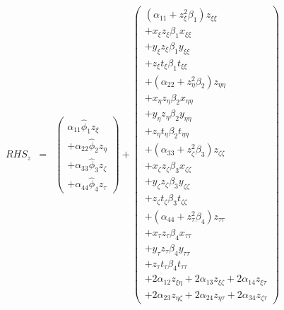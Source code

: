 \begin{eqnarray}
RHS_z
&=&
\left(
\begin{array}{r}
\alpha_{11} \widehat{\phi}_1 z_{\xi} 
\\
+
\alpha_{22} \widehat{\phi}_2 z_{\eta} 
\\
+
\alpha_{33} \widehat{\phi}_3 z_{\zeta} 
\\
+
\alpha_{44} \widehat{\phi}_4 z_{\tau} 
\end{array}
\right)
+
\left(
\begin{array}{r}
\left(\alpha_{11} + z_{\xi}^2 \beta_1 \right) z_{\xi \xi}
\\
+ x_{\xi} z_{\xi} \beta_1 x_{\xi \xi} 
\\
+ y_{\xi} z_{\xi} \beta_1 y_{\xi \xi} 
\\
+ z_{\xi} t_{\xi} \beta_1 t_{\xi \xi} 
\\
+
\left(\alpha_{22} + z_{\eta}^2 \beta_2 \right) z_{\eta \eta}
\\
+ x_{\eta} z_{\eta} \beta_2 x_{\eta \eta} 
\\
+ y_{\eta} z_{\eta} \beta_2 y_{\eta \eta} 
\\
+ z_{\eta} t_{\eta} \beta_2 t_{\eta \eta} 
\\
+
\left(\alpha_{33} + z_{\zeta}^2 \beta_3 \right) z_{\zeta \zeta}
\\
+ x_{\zeta} z_{\zeta} \beta_3 x_{\zeta \zeta} 
\\
+ y_{\zeta} z_{\zeta} \beta_3 y_{\zeta \zeta} 
\\
+ z_{\zeta} t_{\zeta} \beta_3 t_{\zeta \zeta} 
\\
+
\left(\alpha_{44} + z_{\tau}^2 \beta_4 \right) z_{\tau \tau}
\\
+ x_{\tau} z_{\tau} \beta_4 x_{\tau \tau} 
\\
+ y_{\tau} z_{\tau} \beta_4 y_{\tau \tau} 
\\
+ z_{\tau} t_{\tau} \beta_4 t_{\tau \tau} 
\\
+ 2 \alpha_{12} z_{\xi \eta}
+ 2 \alpha_{13} z_{\xi \zeta}
+ 2 \alpha_{14} z_{\xi \tau}
\\
+ 2 \alpha_{23} z_{\eta \zeta}
+ 2 \alpha_{24} z_{\eta \tau}
+ 2 \alpha_{34} z_{\zeta \tau}
\end{array}
\right)
\nonumber
\end{eqnarray}

